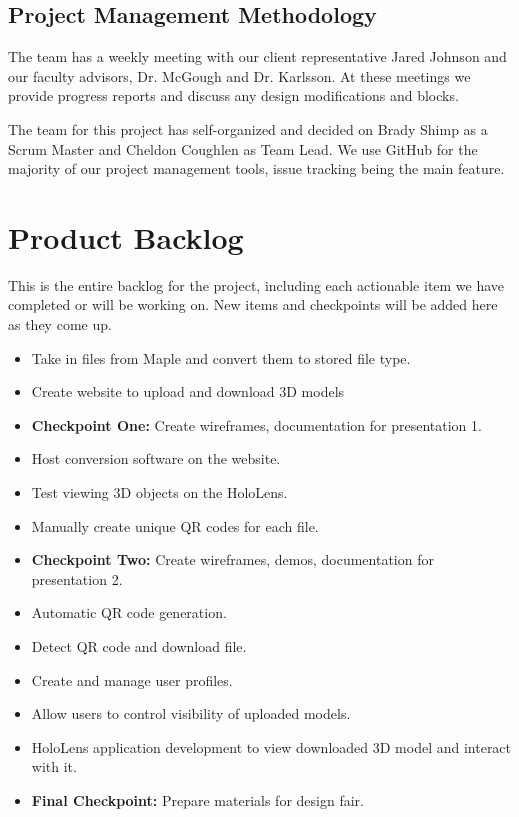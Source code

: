 \subsection{Project Management Methodology}
The team has a weekly meeting with our client representative Jared Johnson and 
our faculty advisors, Dr. McGough and Dr. Karlsson. At these meetings we provide
progress reports and discuss any design modifications and blocks.

The team for this project has self-organized and decided on Brady Shimp as a
Scrum Master and Cheldon Coughlen as Team Lead. We use GitHub for the majority 
of our project management tools, issue tracking being the main feature.





\section{Product Backlog}


This is the entire backlog for the project, including each actionable item we 
have completed or will be working on. New items and checkpoints will be added 
here as they come up.

\begin{itemize}
\item Take in files from Maple and convert them to stored file type.
\item Create website to upload and download 3D models
\item \textbf{Checkpoint One:} Create wireframes, documentation for presentation 1.
\item Host conversion software on the website.
\item Test viewing 3D objects on the HoloLens.
\item Manually create unique QR codes for each file. 
\item \textbf{Checkpoint Two:} Create wireframes, demos, documentation for presentation 
2.
\item Automatic QR code generation.
\item Detect QR code and download file.
\item Create and manage user profiles.
\item Allow users to control visibility of uploaded models.
\item HoloLens application development to view downloaded 3D model and interact 
with it.
\item \textbf{Final Checkpoint:} Prepare materials for design fair.
\end{itemize}


